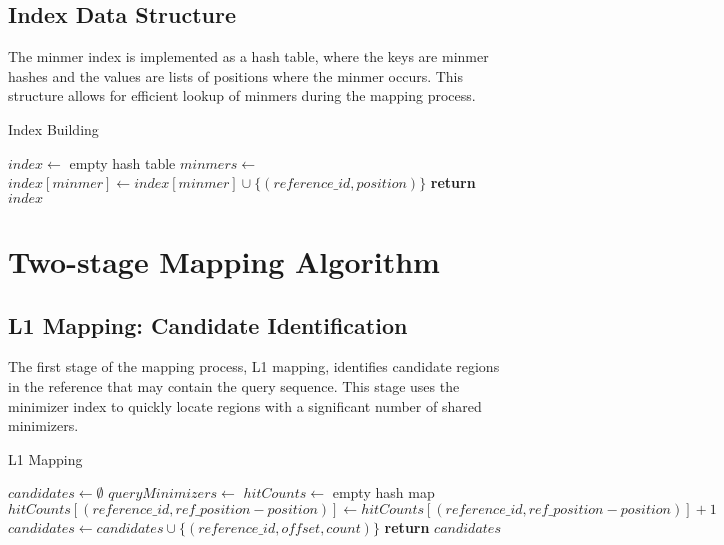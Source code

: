 \documentclass{article}
\begin{document}
\subsection{Index Data Structure}

The minmer index is implemented as a hash table, where the keys are minmer hashes and the values are lists of positions where the minmer occurs. This structure allows for efficient lookup of minmers during the mapping process.

\begin{algorithm}
\caption{Index Building}
\begin{algorithmic}[1]
\State $index \gets$ empty hash table
    \State $minmers \gets$ 
        \State $index[minmer] \gets index[minmer] \cup \{(reference\_id, position)\}$
    \EndFor
\EndFor
\State \textbf{return} $index$
\EndProcedure
\end{algorithmic}
\end{algorithm}

\section{Two-stage Mapping Algorithm}

\subsection{L1 Mapping: Candidate Identification}

The first stage of the mapping process, L1 mapping, identifies candidate regions in the reference that may contain the query sequence. This stage uses the minimizer index to quickly locate regions with a significant number of shared minimizers.

\begin{algorithm}
\caption{L1 Mapping}
\begin{algorithmic}[1]
\State $candidates \gets \emptyset$
\State $queryMinimizers \gets$ 
\State $hitCounts \gets$ empty hash map
            \State $hitCounts[(reference\_id, ref\_position - position)] \gets hitCounts[(reference\_id, ref\_position - position)] + 1$
        \EndFor
    \EndIf
\EndFor
{}
        \State $candidates \gets candidates \cup \{(reference\_id, offset, count)\}$
    \EndIf
\EndFor
\State \textbf{return} $candidates$
\EndProcedure
\end{algorithmic}
\end{algorithm}
\end{document}
